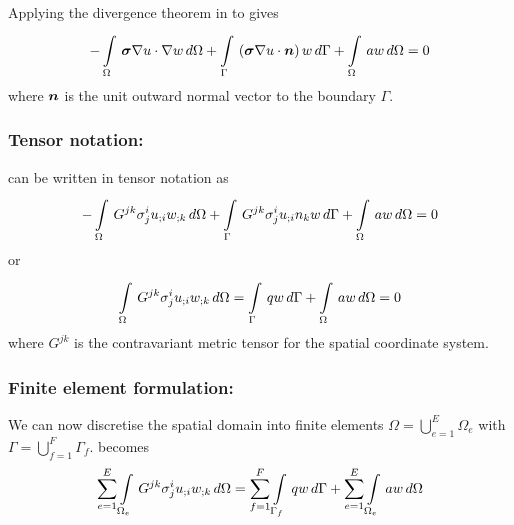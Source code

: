 Applying the divergence theorem in 
to  gives
\begin{equation}
  -\gint{\Omega}{}{\dotprod{\tensor{\sigma}
      \gradient{u}}{\gradient{w}}}{\Omega}
  +\gint{\Gamma}{}{\pbrac{\dotprod{\tensor{\sigma}\gradient{u}}{\normal}}w}{\Gamma}+
  \gint{\Omega}{}{aw}{\Omega}=0
  \label{eqn:Poissonweakform2}
\end{equation}
where $\normal$ is the unit outward normal vector to the boundary $\Gamma$.

\subsubsection{Tensor notation:}

 can be written in tensor notation as
\begin{equation}
  -  \displaystyle\int\limits_{\Omega}^{} \,G^{jk}\sigma^{i}_{j} {u}_{;i}  {w}_{;k} \,d\Omega +
    \displaystyle\int\limits_{\Gamma}^{} \,G^{jk}\sigma^{i}_{j} {u}_{;i} n_{k}w\,d\Gamma  +
    \displaystyle\int\limits_{\Omega}^{} \,aw\,d\Omega =0
  \label{eqn:Poissontensorform1}
\end{equation}
or
\begin{equation}
    \displaystyle\int\limits_{\Omega}^{} \,G^{jk}\sigma^{i}_{j} {u}_{;i}  {w}_{;k} \,d\Omega 
  =  \displaystyle\int\limits_{\Gamma}^{} \,qw\,d\Gamma  +
    \displaystyle\int\limits_{\Omega}^{} \,aw\,d\Omega =0
  \label{eqn:Poissontensorform2}
\end{equation}
where $G^{jk}$ is the contravariant metric tensor for the spatial coordinate system.

\subsubsection{Finite element formulation:}


We can now discretise the spatial domain into finite elements \ie $\Omega=
\displaystyle{\bigcup_{e=1}^{E}}\Omega_{e}$ with
$\Gamma=\displaystyle{\bigcup_{f=1}^{F}}\Gamma_{f}$. 
 becomes
\begin{equation}
  \displaystyle\sum_{e=1}^{E}  \displaystyle\int\limits_{\Omega_{e}}^{} \,G^{jk}\sigma^{i}_{j}
     {u}_{;i}  {w}_{;k} \,d\Omega =
  \displaystyle\sum_{f=1}^{F}  \displaystyle\int\limits_{\Gamma_{f}}^{} \,qw\,d\Gamma  +
  \displaystyle\sum_{e=1}^{E}  \displaystyle\int\limits_{\Omega_{e}}^{} \,aw\,d\Omega 
  \label{eqn:Poissonfemform}
\end{equation}


